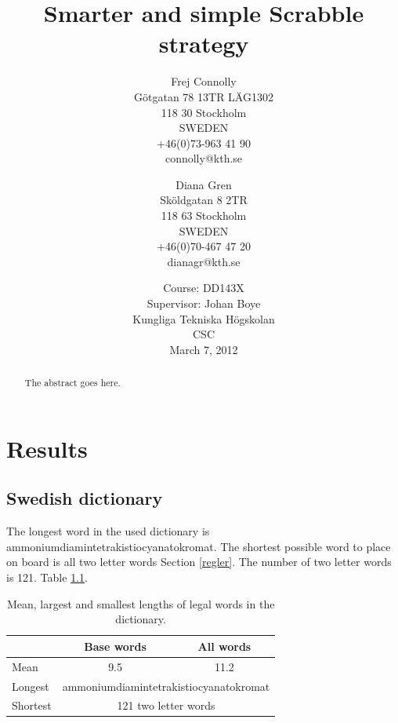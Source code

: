 \documentclass[a4paper, 12pt]{report}
\begin{document}
\graphicspath{{./images/}}
\title{Smarter and simple Scrabble strategy}
\date{Course: DD143X \\ Supervisor: Johan Boye \\ Kungliga Tekniska Högskolan \\ CSC \\ March 7, 2012}
\author{Frej Connolly \\ Götgatan 78 13TR LÄG1302 \\ 118 30 Stockholm \\ SWEDEN \\ +46(0)73-963 41 90 \\ connolly@kth.se \\
        \and Diana Gren \\ Sköldgatan 8 2TR \\ 118 63 Stockholm \\ SWEDEN \\ +46(0)70-467 47 20 \\ dianagr@kth.se}

\maketitle
\begin{abstract}
The abstract goes here.
\end{abstract}
\tableofcontents


\chapter{Results}
\section{Swedish dictionary}
The longest word in the used dictionary is ammoniumdiamintetrakistiocyanatokromat. The shortest possible word to place on board is all two letter words Section \ref{regler}. The number of two letter words is 121. Table \ref{table:dictionary+length}.
\begin{table}[h]
\centering
	\begin{tabular}{l | c | c}
	& Base words & All words \\
	\hline
	Mean & 9.5 & 11.2 \\
	\hline
	Longest & \multicolumn{2}{c}{ammoniumdiamintetrakistiocyanatokromat} \\
	\hline
	Shortest & \multicolumn{2}{c}{121 two letter words} \\ 
	\end{tabular}
\caption{Mean, largest and smallest lengths of legal words in the dictionary.}
\label{table:dictionary+length}
\end{table}
\end{document}
